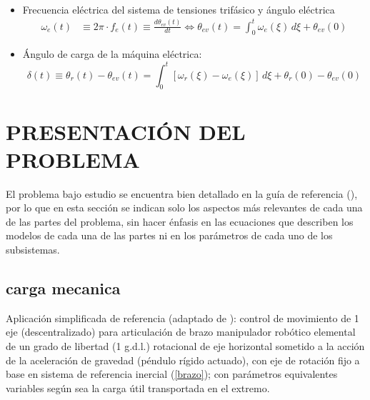 \documentclass[a4paper, 10pt, onecolumn,journal]{ieeeconf}
\begin{document}
\begin{itemize}
\begin{align}
        \label{sistema de tensiones trifásico real}
    \end{align}
    \item Frecuencia eléctrica del sistema de tensiones trifásico y ángulo eléctrica
    \begin{align}
        \omega_e(t) &\equiv 2\pi \cdot f_e(t) \equiv \frac{d\theta_{ev}(t)}{dt} \iff \theta_{ev}(t) = \int_{0}^{t} \omega_e(\xi) \, d\xi + \theta_{ev}(0)
        \label{frecuencia eléctrica y ángulo eléctrico}
    \end{align}
    \item Ángulo de carga de la máquina eléctrica:
    \begin{equation}
        \delta(t) \equiv \theta_r(t) - \theta_{ev}(t) = \int_{0}^{t} [\omega_r(\xi) - \omega_e(\xi)] \, d\xi + \theta_r(0) - \theta_{ev}(0)
        \label{ángulo de carga}
    \end{equation}
\end{itemize}


\section{PRESENTACIÓN DEL PROBLEMA}
El problema bajo estudio se encuentra bien detallado en la guía de referencia (\cite{c1}), por lo que en esta sección se indican solo los aspectos más relevantes de cada una de las partes del problema, sin hacer énfasis en las ecuaciones que describen los modelos de cada una de las partes ni en los parámetros de cada uno de los subsistemas.

\subsection{\textbf{carga mecanica}}
Aplicación simplificada de referencia (adaptado de \cite{c2}): control de movimiento de 1 eje (descentralizado) para articulación de brazo manipulador robótico elemental de un grado de libertad (1 g.d.l.) rotacional de eje horizontal sometido a la acción de la aceleración de gravedad (péndulo rígido actuado), con eje de rotación fijo a base en sistema de referencia inercial (\cref{brazo}); con parámetros equivalentes variables según sea la carga útil transportada en el extremo.
\end{document}
